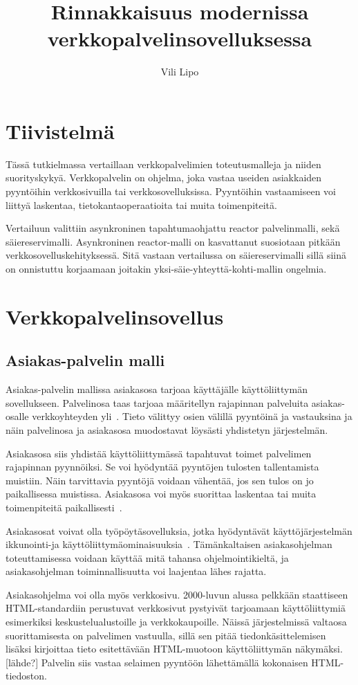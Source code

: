 \documentclass[12pt]{article}
\title{Rinnakkaisuus modernissa verkkopalvelinsovelluksessa}
\author{Vili Lipo}
\begin{document}
\maketitle
\newpage
\tableofcontents
\newpage
\section*{Tiivistelmä}
Tässä tutkielmassa vertaillaan verkkopalvelimien toteutusmalleja
ja niiden suorityskykyä. Verkkopalvelin on ohjelma, joka vastaa useiden asiakkaiden pyyntöihin
verkkosivuilla tai verkkosovelluksissa. Pyyntöihin vastaamiseen
voi liittyä laskentaa, tietokantaoperaatioita tai muita toimenpiteitä.

Vertailuun valittiin asynkroninen tapahtumaohjattu reactor palvelinmalli, sekä säiereservimalli.
Asynkroninen reactor-malli on kasvattanut suosiotaan pitkään verkkosovelluskehityksessä.
Sitä vastaan vertailussa on säiereservimalli sillä siinä on
onnistuttu korjaamaan joitakin yksi-säie-yhteyttä-kohti-mallin ongelmia.
\section{Verkkopalvelinsovellus}
\subsection{Asiakas-palvelin malli}
Asiakas-palvelin mallissa
asiakasosa tarjoaa käyttäjälle käyttöliittymän sovellukseen. Palvelinosa taas
tarjoaa määritellyn rajapinnan
palveluita asiakas-osalle verkkoyhteyden yli~\cite{sinha_client-server_1992}.
Tieto välittyy osien välillä pyyntöinä ja vastauksina ja näin palvelinosa ja asiakasosa
muodostavat löysästi yhdistetyn järjestelmän.

Asiakasosa siis yhdistää käyttöliittymässä tapahtuvat toimet palvelimen
rajapinnan pyynnöiksi. Se voi hyödyntää pyyntöjen tulosten tallentamista
muistiin. Näin tarvittavia pyyntöjä voidaan vähentää, jos sen tulos
on jo paikallisessa muistissa. Asiakasosa voi myös suorittaa
laskentaa tai muita toimenpiteitä paikallisesti~\cite{sinha_client-server_1992}.

Asiakasosat voivat olla työpöytäsovelluksia, jotka hyödyntävät käyttöjärjestelmän
ikkunointi-ja käyttöliittymäominaisuuksia~\cite{sinha_client-server_1992}.
Tämänkaltaisen asiakasohjelman toteuttamisessa voidaan käyttää mitä tahansa ohjelmointikieltä,
ja asiakasohjelman toiminnallisuutta voi laajentaa lähes rajatta.

Asiakasohjelma voi olla myös verkkosivu. 2000-luvun alussa
pelkkään staattiseen HTML-standardiin perustuvat verkkosivut pystyivät
tarjoamaan käyttöliittymiä esimerkiksi keskustelualustoille ja verkkokaupoille.
Näissä järjestelmissä valtaosa suorittamisesta on palvelimen vastuulla,
sillä sen pitää tiedonkäsittelemisen lisäksi kirjoittaa tieto
esitettävään HTML-muotoon käyttöliittymän näkymäksi.[lähde?] Palvelin
siis vastaa selaimen pyyntöön lähettämällä kokonaisen HTML-tiedoston.
\end{document}
